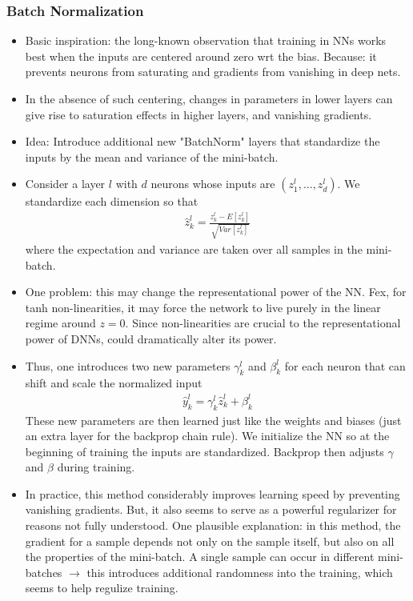 \documentclass[norsk,a4paper,11pt]{article}
\begin{document}
\subsubsection{Batch Normalization}
\begin{itemize}
	\item Basic inspiration: the long-known observation that training in NNs works best when the inputs are centered around zero wrt the bias. Because: it prevents neurons from saturating and gradients from vanishing in deep nets.
	\item In the absence of such centering, changes in parameters in lower layers can give rise to saturation effects in higher layers, and vanishing gradients. 
	\item Idea: Introduce additional new "BatchNorm" layers that standardize the inputs by the mean and variance of the mini-batch. 
	\item Consider a layer $l$ with $d$ neurons whose inputs are $(z_1^l, ..., z_d^l)$. We standardize each dimension so that
	\begin{align}
		\hat{z}_k^l = \frac{z_k^l - E[z_k^l]}{\sqrt{Var[z_k^l]}}
	\end{align} 
	where the expectation and variance are taken over all samples in the mini-batch. 
	\item One problem: this may change the representational power of the NN. Fex, for tanh non-linearities, it may force the network to live purely in the linear regime around $z=0$. Since non-linearities are crucial to the representational power of DNNs, could dramatically alter its power.
	\item Thus, one introduces two new parameters $\gamma_k^l$ and $\beta_k^l$ for each neuron that can shift and scale the normalized input 
	\begin{align}
		\hat{y}_k^l = \gamma_k^l \hat{z}_k^l + \beta_k^l
	\end{align}
	These new parameters are then learned just like the weights and biases (just an extra layer for the backprop chain rule). We initialize the NN so at the beginning of training the inputs are standardized. Backprop then adjusts $\gamma$ and $\beta$ during training.
	\item In practice, this method considerably improves learning speed by preventing vanishing gradients. But, it also seems to serve as a powerful regularizer for reasons not fully understood. One plausible explanation: in this method, the gradient for a sample depends not only on the sample itself, but also on all the properties of the mini-batch. A single sample can occur in different mini-batches $\rightarrow$ this introduces additional randomness into the training, which seems to help regulize training.
\end{itemize}
\end{document}
